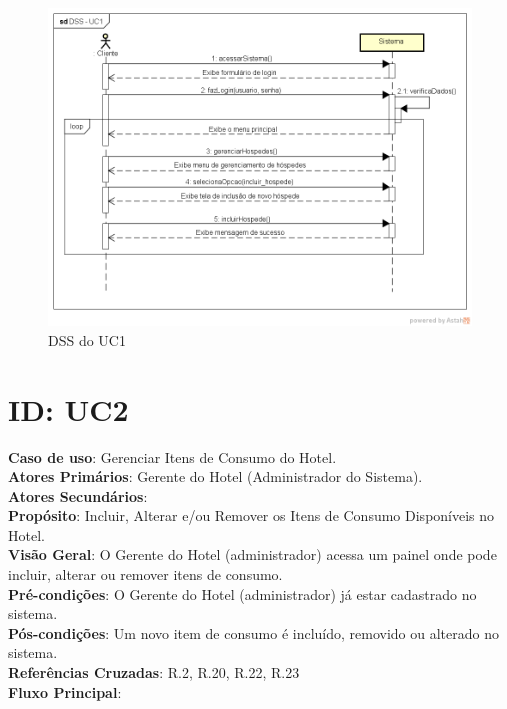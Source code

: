 \documentclass[notitlepage]{article}
\begin{document}
\begin{figure}[!htbp]
	\centering
  \includegraphics[scale=0.65]{UC1.png}
  \caption{DSS do UC1}
  \label{fig:UC1}
\end{figure}

\clearpage

\section{ID: UC2}
\noindent\textbf{Caso de uso}: Gerenciar Itens de Consumo do Hotel.\\
\textbf{Atores Primários}: Gerente do Hotel (Administrador do Sistema). \\
\textbf{Atores Secundários}: \\
\textbf{Propósito}: Incluir, Alterar e/ou Remover os Itens de Consumo Disponíveis no Hotel.\\
\textbf{Visão Geral}: O Gerente do Hotel (administrador) acessa um painel onde pode incluir, alterar ou remover itens de consumo.\\
\textbf{Pré-condições}: O Gerente do Hotel (administrador) já estar cadastrado no sistema.\\
\textbf{Pós-condições}: Um novo item de consumo é incluído, removido ou alterado no sistema.\\
\textbf{Referências Cruzadas}: R.2, R.20, R.22, R.23\\
\newline
\textbf{Fluxo Principal}:\\
\end{document}

